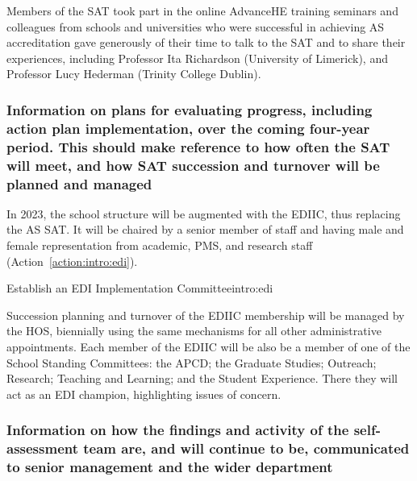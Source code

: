 Members of the SAT took part in the online AdvanceHE training seminars and colleagues from schools and universities who were successful in achieving AS accreditation gave generously of their time to talk to the SAT and to share their experiences, including Professor Ita Richardson (University of Limerick), and Professor Lucy Hederman (Trinity College Dublin).







\subsubsection{Information on plans for evaluating progress, including action plan implementation, over the coming four-year period. This should make reference to how often the SAT will meet, and how SAT succession and turnover will be planned and managed}

In 2023,  the school structure will be augmented with the \ac{EDIIC}, thus replacing the AS SAT. It will be chaired by a senior member of staff and having male and female representation from academic, \ac{PMS}, and research staff (Action~\ref{action:intro:edi}). 



\begin{actionblock}{\ksspace{}Establish an EDI Implementation Committee}{intro:edi}
\actintroedi
\hfill{
    \hypersetup{hidelinks}
    \hyperlink{a2}{\gotoactionsymbol{}}
}
\end{actionblock}



Succession planning and turnover of the EDIIC membership will be managed by the \ac{HOS}, biennially using the same mechanisms for all other administrative appointments. Each member of the EDIIC will be also be a member of one of the School Standing  Committees: the \ac{APCD}; the Graduate Studies; Outreach; Research; Teaching and Learning; and the Student Experience. There they will act as an EDI champion, highlighting issues of concern.





\subsubsection{Information on how the findings and activity of the self-assessment team are, and will continue to be, communicated to senior management and the wider department}

